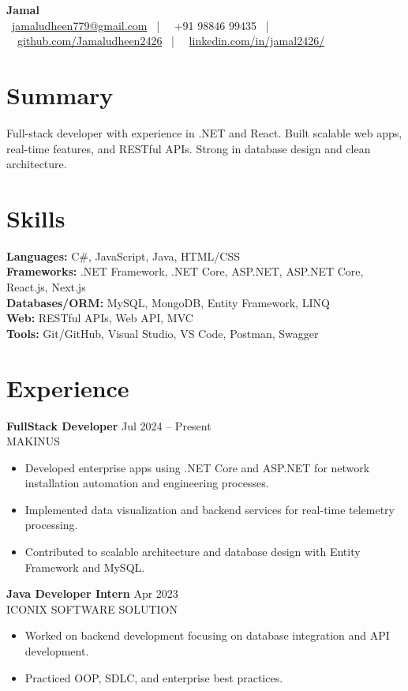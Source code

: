 \documentclass[11pt,a4paper]{article}
\begin{document}
\begin{center}
  {\LARGE \textbf{Jamal}}\\[2pt]
  \faAt\ \href{mailto:jamaludheen779@gmail.com}{jamaludheen779@gmail.com}
  \ | \ \faPhone\ +91 98846 99435
  \ | \ \faGithub\ \href{https://github.com/Jamaludheen2426}{github.com/Jamaludheen2426}
  \ | \ \faLinkedin\ \href{https://www.linkedin.com/in/jamal2426/}{linkedin.com/in/jamal2426/}
\end{center}

\section*{Summary}
Full-stack developer with experience in .NET and React. Built scalable web apps, real-time features, and RESTful APIs. Strong in database design and clean architecture.

\section*{Skills}
\textbf{Languages:} C\#, JavaScript, Java, HTML/CSS\\
\textbf{Frameworks:} .NET Framework, .NET Core, ASP.NET, ASP.NET Core, React.js, Next.js\\
\textbf{Databases/ORM:} MySQL, MongoDB, Entity Framework, LINQ\\
\textbf{Web:} RESTful APIs, Web API, MVC\\
\textbf{Tools:} Git/GitHub, Visual Studio, VS Code, Postman, Swagger\\

\section*{Experience}
\textbf{FullStack Developer} \hfill Jul 2024 -- Present\\
MAKINUS\\
\begin{itemize}[leftmargin=*,nosep]
  \item Developed enterprise apps using .NET Core and ASP.NET for network installation automation and engineering processes.
  \item Implemented data visualization and backend services for real-time telemetry processing.
  \item Contributed to scalable architecture and database design with Entity Framework and MySQL.
\end{itemize}

\textbf{Java Developer Intern} \hfill Apr 2023\\
ICONIX SOFTWARE SOLUTION\\
\begin{itemize}[leftmargin=*,nosep]
  \item Worked on backend development focusing on database integration and API development.
  \item Practiced OOP, SDLC, and enterprise best practices.
\end{itemize}
\end{document}
